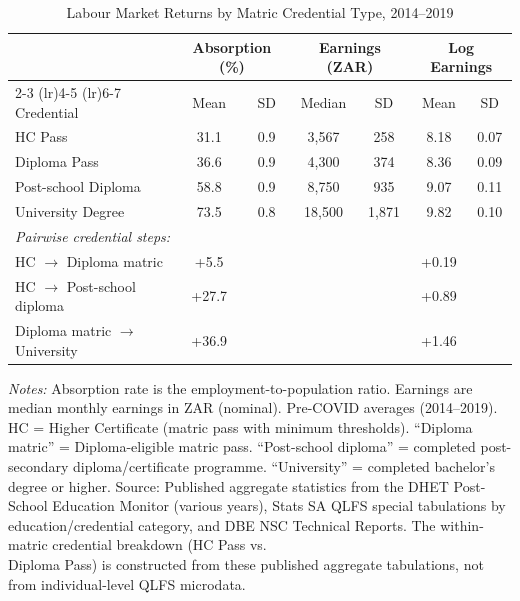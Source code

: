 \begin{table}[H]
\centering
\caption{Labour Market Returns by Matric Credential Type, 2014--2019}
\label{tab:pass_type_returns}
\begin{threeparttable}
\begin{tabular}{lcccccc}
\toprule
 & \multicolumn{2}{c}{Absorption (\%)} & \multicolumn{2}{c}{Earnings (ZAR)} & \multicolumn{2}{c}{Log Earnings} \\
\cmidrule(lr){2-3} \cmidrule(lr){4-5} \cmidrule(lr){6-7}
Credential & Mean & SD & Median & SD & Mean & SD \\
\midrule
HC Pass & 31.1 & 0.9 & 3,567 & 258 & 8.18 & 0.07 \\
Diploma Pass & 36.6 & 0.9 & 4,300 & 374 & 8.36 & 0.09 \\
Post-school Diploma & 58.8 & 0.9 & 8,750 & 935 & 9.07 & 0.11 \\
University Degree & 73.5 & 0.8 & 18,500 & 1,871 & 9.82 & 0.10 \\
\midrule
\multicolumn{7}{l}{\textit{Pairwise credential steps:}} \\
HC $\rightarrow$ Diploma matric & +5.5 & & & & +0.19 & \\
HC $\rightarrow$ Post-school diploma & +27.7 & & & & +0.89 & \\
Diploma matric $\rightarrow$ University & +36.9 & & & & +1.46 & \\
\bottomrule
\end{tabular}
\begin{tablenotes}[flushleft]
\small
\item \textit{Notes:} Absorption rate is the employment-to-population ratio. Earnings are median monthly earnings in ZAR (nominal). Pre-COVID averages (2014--2019). HC = Higher Certificate (matric pass with minimum thresholds). ``Diploma matric'' = Diploma-eligible matric pass. ``Post-school diploma'' = completed post-secondary diploma/certificate programme. ``University'' = completed bachelor's degree or higher. Source: Published aggregate statistics from the DHET Post-School Education Monitor (various years), Stats SA QLFS special tabulations by education/credential category, and DBE NSC Technical Reports. The within-matric credential breakdown (HC Pass vs.\\ Diploma Pass) is constructed from these published aggregate tabulations, not from individual-level QLFS microdata.
\end{tablenotes}
\end{threeparttable}
\end{table}
